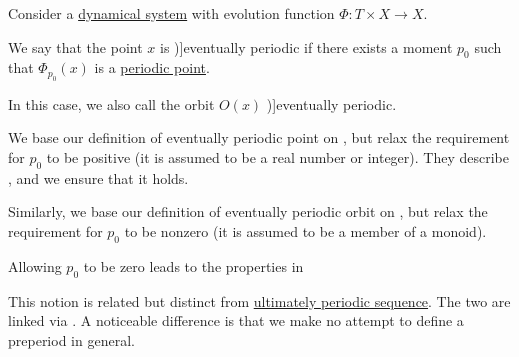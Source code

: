 \begin{definition}\label{def:dynamical_system_eventual_periodicity}
  Consider a \hyperref[def:dynamical_system]{dynamical system} with evolution function \( \Phi: T \times X \to X \).

  We say that the point \( x \) is \term[en=eventually periodic (point) (\cite[2]{BrinStuck2002DynamicalSystems})]{eventually periodic} if there exists a moment \( p_0 \) such that \( \Phi_{p_0}(x) \) is a \hyperref[def:dynamical_system_periodicity]{periodic point}.

  In this case, we also call the orbit \( O(x) \) \term[en=eventually periodic (orbit) (\cite[def. 12(ii)]{GiuntiMazzola2012DynamicalSystemsOnMonoids})]{eventually periodic}.
\end{definition}
\begin{comments}
  \item We base our definition of eventually periodic point on , but relax the requirement for \( p_0 \) to be positive (it is assumed to be a real number or integer). They describe , and we ensure that it holds.

  Similarly, we base our definition of eventually periodic orbit on , but relax the requirement for \( p_0 \) to be nonzero (it is assumed to be a member of a monoid).

  Allowing \( p_0 \) to be zero leads to the properties in 

  \item This notion is related but distinct from \hyperref[def:ultimately_periodic_sequence]{ultimately periodic sequence}. The two are linked via . A noticeable difference is that we make no attempt to define a preperiod in general.
\end{comments}

